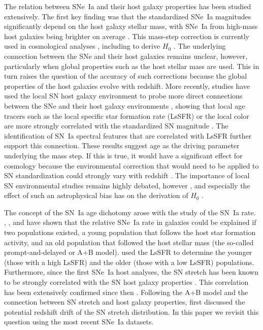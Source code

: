 \documentclass[]{aa}
\begin{document}
The relation between SNe~Ia and their host galaxy properties has been studied
extensively. The first key finding was that the standardized SNe~Ia magnitudes
significantly depend on the host galaxy stellar mass, with SNe~Ia from high-mass
host galaxies being brighter on average \cite[e.g.,][]{kelly2010, sullivan2010,
childress2013, betoule2014, kim19, smith2020}. This mass-step correction is
currently used in cosmological analyses \citep[e.g.,][]{betoule2014,
scolnic2018a}, including to derive $H_0$ \citep{riess2016, riess2019}. The
underlying connection between the SNe and their host galaxies remains unclear,
however, particularly when global properties such as the host stellar mass are
used. This in turn raises the question of the accuracy of such corrections
because the global properties of the host galaxies evolve with redshift. More
recently, studies have used the local SN host galaxy environment to probe more
direct connections between the SNe and their host galaxy environments
\citep{rigault2013}, showing that local age tracers such as the local specific
star formation rate (LsSFR) or the local color are more strongly correlated with
the standardized SN magnitude \citep{roman2018, kim18, rigault2020}. The
identification of SN~Ia spectral features that are correlated with LsSFR
\citep{nordin2018} further support this connection. These results suggest age as
the driving parameter underlying the mass step. If this is true, it would have a
significant effect for cosmology because the environmental correction that would
need to be applied to SN standardization could strongly vary with redshift
\citep{rigault2013, childress2014, scolnic2018a}. The importance of local SN
environmental studies remains highly debated, however \cite[e.g.,][]{jones2015,
jones2019}, and especially the effect of such an astrophysical bias has on the
derivation of $H_0$ \citep{jones2015, riess2016, riess2018, rose2019}. 

The concept of the SN~Ia age dichotomy arose with the study of the SN~Ia rate.
\cite{mannucci2005}, \cite{scannapieco2005}, \cite{sullivan2006} and
\cite{smith2012} have shown that the relative SNe~Ia rate in galaxies could be
explained if two populations existed, a young population that follows the host
star formation activity, and an old population that followed the host stellar
mass (the so-called prompt-and-delayed or A+B model). \cite{rigault2020} used
the LsSFR to determine the younger (those with a high LsSFR) and the older
(those with a low LsSFR) populations. Furthermore, since the first SNe~Ia host
analyses, the SN stretch has been known to be strongly correlated with the SN
host galaxy properties \citep{hamuy1996, hamuy2000}. This correlation has been
extensively confirmed since then \citep[e.g.,][]{neill2009, lampeitl2010,
gupta2011, dandrea2011, pan2014}. Following the A+B model and the connection
between SN stretch and host galaxy properties, \cite{howell2007} first discussed
the potential redshift drift of the SN stretch distribution. In this paper we
revisit this question using the most recent SNe~Ia datasets.
\end{document}
